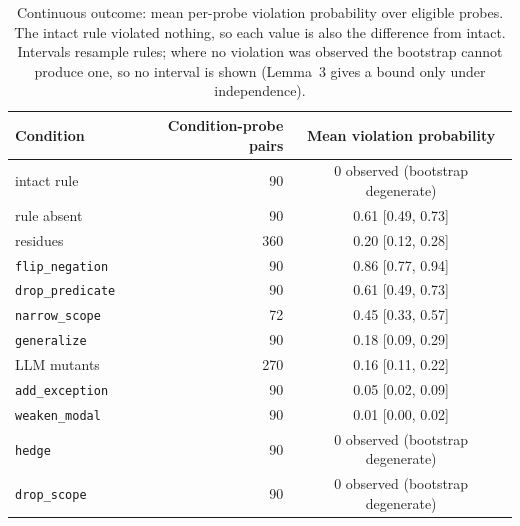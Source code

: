 \begin{table}[t]
\centering\small\setlength{\tabcolsep}{4pt}
\caption{Continuous outcome: mean per-probe violation probability over eligible probes. The intact rule violated nothing, so each value is also the difference from intact. Intervals resample rules; where no violation was observed the bootstrap cannot produce one, so no interval is shown (Lemma~3 gives a bound only under independence).}\label{tab:rates}
\begin{tabular}{lrc}
\toprule
Condition & Condition-probe pairs & Mean violation probability \\
\midrule
intact rule & 90 & 0 observed (bootstrap degenerate) \\
rule absent & 90 & 0.61 [0.49, 0.73] \\
residues & 360 & 0.20 [0.12, 0.28] \\
\texttt{flip\_negation} & 90 & 0.86 [0.77, 0.94] \\
\texttt{drop\_predicate} & 90 & 0.61 [0.49, 0.73] \\
\texttt{narrow\_scope} & 72 & 0.45 [0.33, 0.57] \\
\texttt{generalize} & 90 & 0.18 [0.09, 0.29] \\
LLM mutants & 270 & 0.16 [0.11, 0.22] \\
\texttt{add\_exception} & 90 & 0.05 [0.02, 0.09] \\
\texttt{weaken\_modal} & 90 & 0.01 [0.00, 0.02] \\
\texttt{hedge} & 90 & 0 observed (bootstrap degenerate) \\
\texttt{drop\_scope} & 90 & 0 observed (bootstrap degenerate) \\
\bottomrule
\end{tabular}
\end{table}
